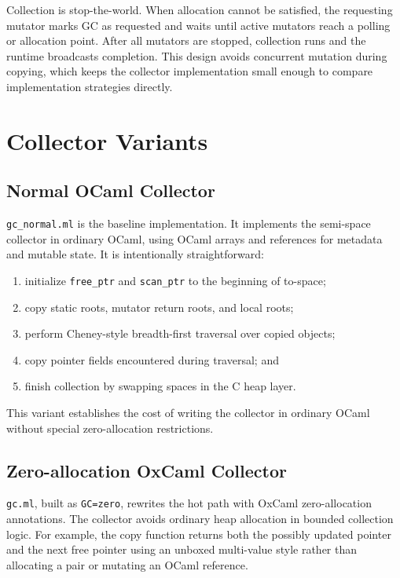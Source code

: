 \documentclass[11pt]{article}
\begin{document}
Collection is stop-the-world. When allocation cannot be satisfied, the
requesting mutator marks GC as requested and waits until active mutators reach a
polling or allocation point. After all mutators are stopped, collection runs and
the runtime broadcasts completion. This design avoids concurrent mutation during
copying, which keeps the collector implementation small enough to compare
implementation strategies directly.

\section{Collector Variants}

\subsection{Normal OCaml Collector}

\texttt{gc\_normal.ml} is the baseline implementation. It implements the
semi-space collector in ordinary OCaml, using OCaml arrays and references for
metadata and mutable state. It is intentionally straightforward:

\begin{enumerate}
  \item initialize \texttt{free\_ptr} and \texttt{scan\_ptr} to the beginning of
  to-space;
  \item copy static roots, mutator return roots, and local roots;
  \item perform Cheney-style breadth-first traversal over copied objects;
  \item copy pointer fields encountered during traversal; and
  \item finish collection by swapping spaces in the C heap layer.
\end{enumerate}

This variant establishes the cost of writing the collector in ordinary OCaml
without special zero-allocation restrictions.

\subsection{Zero-allocation OxCaml Collector}

\texttt{gc.ml}, built as \texttt{GC=zero}, rewrites the hot path with OxCaml
zero-allocation annotations. The collector avoids ordinary heap allocation in
bounded collection logic. For example, the copy function returns both the
possibly updated pointer and the next free pointer using an unboxed multi-value
style rather than allocating a pair or mutating an OCaml reference.
\end{document}
